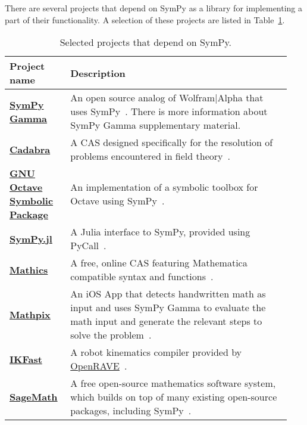 There are several projects that depend on SymPy as a library for implementing
a part of their functionality. A selection of these projects are listed in
Table~\ref{projects-table}.

\begin{longtable}[htbc]{>{\raggedright}p{0.2\linewidth}p{0.74\linewidth}}
\caption{Selected projects that depend on SymPy.\label{projects-table}}\\
\toprule
\textbf{Project name} & \textbf{Description} \\
\midrule

\href{http://sympygamma.com/}{\textbf{SymPy Gamma}} & An open source
  analog of Wolfram|Alpha that uses SymPy~\cite{SymPyGamma}.  There is more
  information about SymPy Gamma supplementary material. \\

\href{http://cadabra.science/index.html}{\textbf{Cadabra}} &
  A CAS designed specifically for the resolution of problems
  encountered in field theory~\cite{Peeters2007cadabra}. \\

\href{https://github.com/cbm755/octsympy}{\textbf{GNU Octave Symbolic Package}} &
  An implementation of a symbolic toolbox for Octave using SymPy~\cite{OctSymPy}. \\

\href{https://github.com/jverzani/SymPy.jl}{\textbf{SymPy.jl}} &
  A Julia interface to SymPy, provided using PyCall~\cite{SymPy.jl}. \\

\href{https://mathics.github.io/}{\textbf{Mathics}} &
  A free, online CAS featuring Mathematica compatible
  syntax and functions~\cite{Mathics}. \\

\href{http://mathpix.com/}{\textbf{Mathpix}} & An iOS App that detects handwritten math as input and uses
  SymPy Gamma to evaluate the math input and generate the relevant
  steps to solve the problem~\cite{Mathpix}. \\

\href{http://openrave.org/docs/latest_stable/openravepy/ikfast/}{\textbf{IKFast}} &
  A robot kinematics compiler provided by
  \href{http://openrave.org/}{OpenRAVE}~\cite{diankov2010ikfast}. \\

\href{http://www.sagemath.org/}{\textbf{SageMath}} &
  A free open-source mathematics software system, which builds on top of many
  existing open-source packages, including SymPy~\cite{sagemath}. \\


\end{longtable}
